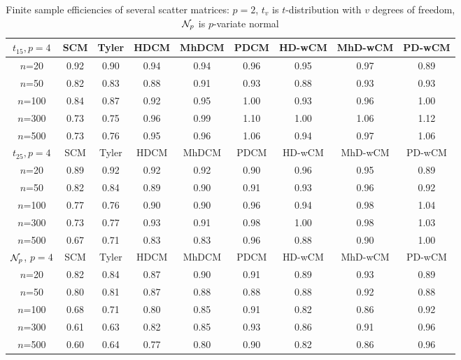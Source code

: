 \begin{table}[ht]
\begin{footnotesize}
\begin{tabular}{c|cc|ccc|ccc}
    $t_{15}, p=4$ & SCM  & Tyler & HDCM & MhDCM & PDCM & HD-wCM & MhD-wCM & PD-wCM \\ \hline
    $n$=20             & 0.92 & 0.90  & 0.94   & 0.94   & 0.96  & 0.95    & 0.97    & 0.89   \\
    $n$=50             & 0.82 & 0.83  & 0.88   & 0.91   & 0.93  & 0.88    & 0.93    & 0.93   \\
    $n$=100            & 0.84 & 0.87  & 0.92   & 0.95   & 1.00  & 0.93    & 0.96    & 1.00   \\
    $n$=300            & 0.73 & 0.75  & 0.96   & 0.99   & 1.10  & 1.00    & 1.06    & 1.12   \\
    $n$=500            & 0.73 & 0.76  & 0.95   & 0.96   & 1.06  & 0.94    & 0.97    & 1.06   \\ \hline
    $t_{25}, p=4$ & SCM  & Tyler & HDCM & MhDCM & PDCM & HD-wCM & MhD-wCM & PD-wCM \\ \hline
    $n$=20             & 0.89 & 0.92  & 0.92   & 0.92   & 0.90  & 0.96    & 0.95    & 0.89   \\
    $n$=50             & 0.82 & 0.84  & 0.89   & 0.90   & 0.91  & 0.93    & 0.96    & 0.92   \\
    $n$=100            & 0.77 & 0.76  & 0.90   & 0.90   & 0.96  & 0.94    & 0.98    & 1.04   \\
    $n$=300            & 0.73 & 0.77  & 0.93   & 0.91   & 0.98  & 1.00    & 0.98    & 1.03   \\
    $n$=500            & 0.67 & 0.71  & 0.83   & 0.83   & 0.96  & 0.88    & 0.90    & 1.00   \\ \hline
    ${\cal{N}}_p$, $p=4$   & SCM  & Tyler & HDCM & MhDCM & PDCM & HD-wCM & MhD-wCM & PD-wCM \\ \hline
    $n$=20             & 0.82 & 0.84  & 0.87   & 0.90   & 0.91  & 0.89    & 0.93    & 0.89   \\
    $n$=50             & 0.80 & 0.81  & 0.87   & 0.88   & 0.88  & 0.88    & 0.92    & 0.88   \\
    $n$=100            & 0.68 & 0.71  & 0.80   & 0.85   & 0.91  & 0.82    & 0.86    & 0.92   \\
    $n$=300            & 0.61 & 0.63  & 0.82   & 0.85   & 0.93  & 0.86    & 0.91    & 0.96   \\
    $n$=500            & 0.60 & 0.64  & 0.77   & 0.80   & 0.90  & 0.82    & 0.86    & 0.96   \\ \hline
    \end{tabular}
\caption{Finite sample efficiencies of several scatter matrices: $p=2$, $t_v$ is $t$-distribution with $v$ degrees of freedom, ${\cal{N}}_p$ is $p$-variate normal}
\label{table:FSEtable4}
\end{footnotesize}
\end{table}

